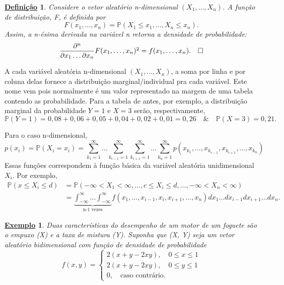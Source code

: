 \documentclass{article}
\newtheorem*{def*}{\underline{Defini\c c\~ao}}
\newtheorem{example}{\underline{Exemplo}}
\begin{document}
\begin{def*}
  Considere o vetor aleatório n-dimensional \((X_{1}, \dotsc , X_{n})\). A função de distribuição, F, é definida por 
  \[
    F(x_{1}, \dotsc , x_{n}) = \mathbb{P}(X_{1} \leq x_{1},\dotsc ,X_{n}\leq x_{n}).
  \]
  Assim, a n-ésima derivada na variável n retorna a densidade de probabilidade:
  \[
    \frac{\partial^{n}}{\partial x_{1}\dotsc \partial x_{n}} F(x_{1},\dotsc ,x_{n})\footnotemark[2] = f(x_{1}, \dotsc , x_{n}).\quad \square
  \]
\end{def*}
A cada variável aleatória n-dimensional \((X_{1}, \dotsc , X_{n})\), a soma por linha e por coluna delas fornece a distribuição marginal/individual pra cada 
variável. Este nome vem pois normalmente é um valor representado na margem de uma tabela contendo as probabilidade. Para a tabela de antes, por exemplo, a distribuição
marginal da probabilidade \(Y = 1\) e \(X = 3\) serão, respectivamente, 
\[
  \mathbb{P}(Y=1) = 0,08 + 0,06 + 0,05 + 0,04 + 0,02 + 0,01 = 0,26\quad\&\quad \mathbb{P}(X = 3) = 0,21.
\]

Para o caso n-dimensional, 
\[
  p(x_{i}) = \mathbb{P}(X_{i} = x_{i}) = \sum\limits_{k_{1}=1}^{\infty}\dotsc \sum\limits_{k_{i-1}=1}^{\infty}\sum\limits_{k_{i+1}=1}^{\infty}\dotsc \sum\limits_{k_{n}=1}^{\infty}p(x_{k_{1}}, \dotsc , x_{k_{i-1}},x_{k_{i+1}},\dotsc ,x_{k_{n}})
\]
Essas funções correspondem à função básica da variável aleatória unidimensional \(X_{i}\). Por exemplo, 
\begin{align*}
  \mathbb{P}(x \leq X_{i}\leq d) &= \mathbb{P}(-\infty<X_{1}<\infty, \dotsc , c \leq X_{i}\leq d, \dotsc , -\infty<X_{n} < \infty)\\
                                 &= \underbrace{\int_{-\infty}^{\infty}\dotsc \int_{-\infty}^{\infty}}_{\text{n-1 vezes}}f(x_{1},\dotsc ,x_{i-1},x_{i},x_{i+1},\dotsc ,x_{n})dx_{1}\dotsc dx_{i-1}dx_{i+1}\dotsc dx_{n}.
\end{align*}
\begin{example}
  Duas características do desempenho de um motor de um foguete são o empuxo (X) e a taxa de mistura (Y). Suponha que (X, Y) seja um vetor aleatório bidimensional com 
  função de densidade de probabilidade 
  \[
    f(x, y)  = \left\{\begin{array}{ll}
        2(x+y-2xy),\quad 0 \leq x \leq 1\\
        2(x+y-2xy),\quad 0 \leq y \leq 1\\
        0,\quad \text{caso contrário}.
    \end{array}\right.
  \]
\end{example}
\end{document}
